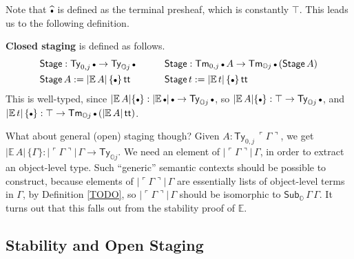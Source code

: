 \documentclass[acmsmall]{acmart}
\newcommand{\msf}[1]{\mathsf{#1}}
\newcommand{\mbb}[1]{\mathbb{#1}}
\newcommand{\wh}[1]{\widehat{#1}}
\newcommand{\mbbo}{\mbb{O}}
\newcommand{\Ty}{\msf{Ty}}
\newcommand{\Tm}{\msf{Tm}}
\newcommand{\Subo}{\msf{Sub}_{\mbbo}}
\renewcommand{\tt}{\msf{tt}}
\newcommand{\emptycon}{\scaleobj{.75}\bullet}
\newcommand{\emb}[1]{\ulcorner#1\urcorner}
\newcommand{\Stage}{\msf{Stage}}
\newcommand{\ev}{\mbb{E}}
\theoremstyle{remark}
\begin{document}
Note that $\wh{\emptycon}$ is defined as the terminal presheaf, which is
constantly $\top$. This leads us to the following definition.

\begin{definition} \textbf{Closed staging} is defined as follows.
\begin{alignat*}{4}
  & \Stage : \Ty_{0,j}\,\emptycon \to \Ty_{\mbbo j}\,\emptycon \hspace{2em} && \Stage : \Tm_{0,j}\,\emptycon\,A \to \Tm_{\mbbo j}\,\emptycon\,(\Stage\,A) \\
  & \Stage\,A := |\ev\,A|\,\{\emptycon\}\,\tt && \Stage\,t := |\ev\,t|\,\{\emptycon\}\,\tt
\end{alignat*}
This is well-typed, since $|\ev\,A|\{\emptycon\} : |\ev\,\emptycon|\,\emptycon \to \Ty_{\mbbo
  j}\,\emptycon$, so $|\ev\,A|\{\emptycon\} : \top \to \Ty_{\mbbo
  j}\,\emptycon$, and $|\ev\,t|\,\{\emptycon\} : \top \to \Tm_{\mbbo
  j}\,\emptycon\,(|\ev\,A|\,\tt)$.
\end{definition}

What about general (open) staging though? Given $A : \Ty_{0,j}\,\emb{\Gamma}$,
we get $|\ev\,A|\,\{\Gamma\} : |\emb{\Gamma}|\,\Gamma \to \Ty_{\mbbo j}$. We
need an element of $|\emb{\Gamma}|\,\Gamma$, in order to extract an object-level
type. Such ``generic'' semantic contexts should be possible to construct, because
elements of $|\emb{\Gamma}|\,\Gamma$ are essentially lists of object-level terms
in $\Gamma$, by Definition \ref{TODO}, so $|\emb{\Gamma}|\,\Gamma$ should be
isomorphic to $\Subo\,\Gamma\,\Gamma$.  It turns out that this falls out from
the stability proof of $\ev$.

\subsection{Stability and Open Staging}
\end{document}

